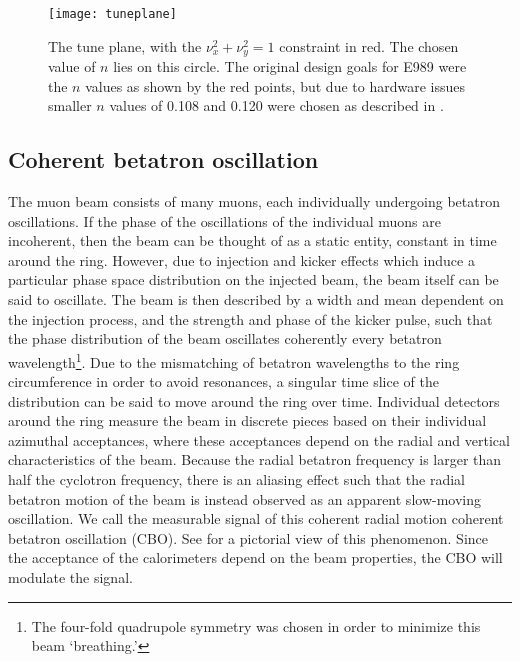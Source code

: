 

\begin{figure}
    \centering
    \texttt{[image: tuneplane]}
    \caption[Tune plane]{The tune plane, with the $\nu_{x}^{2} + \nu_{y}^{2} = 1$ constraint in red. The chosen value of $n$ lies on this circle. The original design goals for E989 were the $n$ values as shown by the red points, but due to hardware issues smaller $n$ values of 0.108 and 0.120 were chosen as described in .}
    \label{fig:tuneplane}
\end{figure}



\subsection{Coherent betatron oscillation}
\label{sub:CBO}

The muon beam consists of many muons, each individually undergoing betatron oscillations. If the phase of the oscillations of the individual muons are incoherent, then the beam can be thought of as a static entity, constant in time around the ring. However, due to injection and kicker effects which induce a particular phase space distribution on the injected beam, the beam itself can be said to oscillate. The beam is then described by a width and mean dependent on the injection process, and the strength and phase of the kicker pulse, such that the phase distribution of the beam oscillates coherently every betatron wavelength\footnote{The four-fold quadrupole symmetry was chosen in order to minimize this beam `breathing.'}. Due to the mismatching of betatron wavelengths to the ring circumference in order to avoid resonances, a singular time slice of the distribution can be said to move around the ring over time. Individual detectors around the ring measure the beam in discrete pieces based on their individual azimuthal acceptances, where these acceptances depend on the radial and vertical characteristics of the beam. Because the radial betatron frequency is larger than half the cyclotron frequency, there is an aliasing effect such that the radial betatron motion of the beam is instead observed as an apparent slow-moving oscillation. We call the measurable signal of this coherent radial motion coherent betatron oscillation (CBO). See  for a pictorial view of this phenomenon. Since the acceptance of the calorimeters depend on the beam properties, the CBO will modulate the \wa signal.

